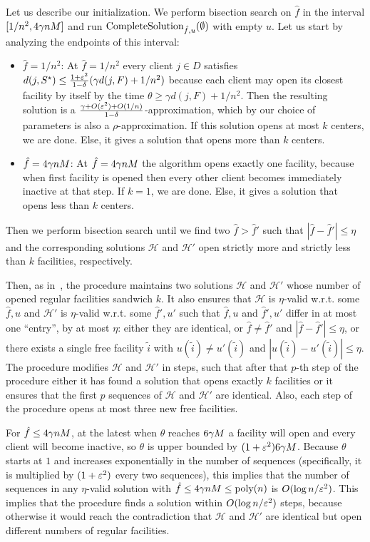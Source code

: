 Let us describe our initialization.
We perform bisection search on $\hat f$ in the interval $[1/n^2, 4\gamma nM]$ and run $\textrm{CompleteSolution}_{\hat f, u}(\emptyset)$ with empty $u$.
Let us start by analyzing the endpoints of this interval:
\begin{itemize}
    \item $\hat f = 1 /n^2$: At $\hat f = 1/n^2$ every client $j \in D$ satisfies $d(j, S^\star) \leq \frac{1+\varepsilon^2}{1-\delta} (\gamma d(j, F) + 1/n^2)$ because each client may open its closest facility by itself by the time $\theta \geq \gamma d(j, F) + 1/n^2$.
    Then the resulting solution is a $\frac{\gamma+O(\varepsilon^2)+O(1/n)}{1-\delta}$-approximation, which by our choice of parameters is also a $\rho$-approximation.
    If this solution opens at most $k$ centers, we are done.
    Else, it gives a solution that opens more than $k$ centers.
    \item $\hat f = 4 \gamma n M$: At $\hat f = 4 \gamma n M$ the algorithm opens exactly one facility, because when first facility is opened then every other client becomes immediately inactive at that step.
    If $k=1$, we are done.
    Else, it gives a solution that opens less than $k$ centers.
\end{itemize}
Then we perform bisection search until we find two $\hat f > \hat f'$ such that $|\hat f - \hat f'| \leq \eta$ and the corresponding solutions $\mathcal{H}$ and $\mathcal{H}'$ open strictly more and strictly less than $k$ facilities, respectively.

Then, as in~\cite{MR4928455-Cohen25}, the procedure maintains two solutions $\mathcal{H}$ and $\mathcal{H}'$ whose number of opened regular facilities sandwich $k$.
It also ensures that $\mathcal{H}$ is $\eta$-valid w.r.t. some $\hat f, u$ and $\mathcal{H}'$ is $\eta$-valid w.r.t. some $\hat f', u'$ such that $\hat f, u$ and $\hat f', u'$ differ in at most one ``entry'', by at most $\eta$: either they are identical, or $\hat f \neq \hat f'$ and $|\hat f - \hat f'| \leq \eta$, or there exists a single free facility $\tilde{i}$ with $u(\tilde i) \neq u'(\tilde i)$  and $|u(\tilde i) - u'(\tilde i)| \leq \eta$.
The procedure modifies $\mathcal{H}$ and $\mathcal{H}'$ in steps, such that after that $p$-th step of the procedure either it has found a solution that opens exactly $k$ facilities or it ensures that the first $p$ sequences of $\mathcal{H}$ and $\mathcal{H}'$ are identical.
Also, each step of the procedure opens at most three new free facilities.

For $\hat f \leq 4\gamma n M$, at the latest when $\theta$ reaches $6 \gamma M$ a facility will open and every client will become inactive, so $\theta$ is upper bounded by $(1+\varepsilon^2) 6 \gamma M$.
Because $\theta$ starts at $1$ and increases exponentially in the number of sequences (specifically, it is multiplied by $(1+\varepsilon^2)$ every two sequences), this implies that the number of sequences in any $\eta$-valid solution with $\hat f \leq 4 \gamma n M \leq \textnormal{poly}(n)$ is $O(\log n / \varepsilon^2)$.
This implies that the procedure finds a solution within $O(\log n / \varepsilon^2)$ steps, because otherwise it would reach the contradiction that $\mathcal{H}$ and $\mathcal{H}'$ are identical but open different numbers of regular facilities.

